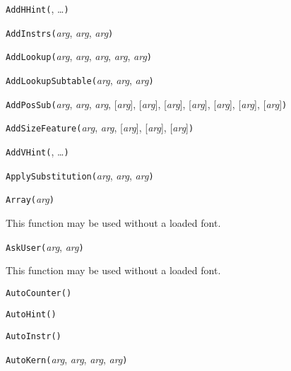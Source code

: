 
\noindent\texttt{AddHHint(}, \ldots\texttt{)}


\noindent\texttt{AddInstrs(}\textit{arg}, \textit{arg}, \textit{arg}\texttt{)}


\noindent\texttt{AddLookup(}\textit{arg}, \textit{arg}, \textit{arg}, \textit{arg}, \textit{arg}\texttt{)}


\noindent\texttt{AddLookupSubtable(}\textit{arg}, \textit{arg}, \textit{arg}\texttt{)}


\noindent\texttt{AddPosSub(}\textit{arg}, \textit{arg}, \textit{arg}, [\textit{arg}], [\textit{arg}], [\textit{arg}], [\textit{arg}], [\textit{arg}], [\textit{arg}], [\textit{arg}]\texttt{)}


\noindent\texttt{AddSizeFeature(}\textit{arg}, \textit{arg}, [\textit{arg}], [\textit{arg}], [\textit{arg}]\texttt{)}


\noindent\texttt{AddVHint(}, \ldots\texttt{)}


\noindent\texttt{ApplySubstitution(}\textit{arg}, \textit{arg}, \textit{arg}\texttt{)}


\noindent\texttt{Array(}\textit{arg}\texttt{)}

This function may be used without a loaded font.


\noindent\texttt{AskUser(}\textit{arg}, \textit{arg}\texttt{)}

This function may be used without a loaded font.


\noindent\texttt{AutoCounter(}\texttt{)}


\noindent\texttt{AutoHint(}\texttt{)}


\noindent\texttt{AutoInstr(}\texttt{)}


\noindent\texttt{AutoKern(}\textit{arg}, \textit{arg}, \textit{arg}, \textit{arg}\texttt{)}


